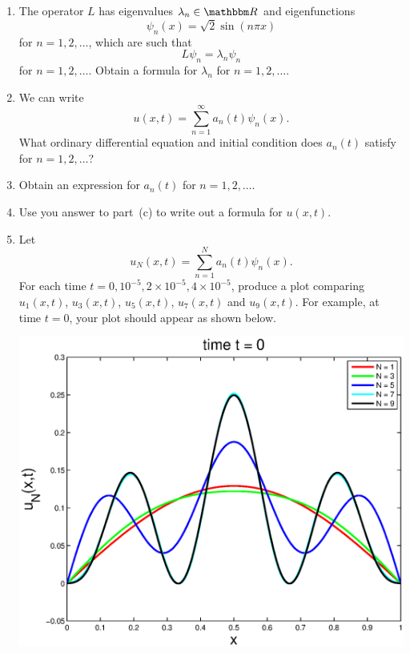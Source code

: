\begin{enumerate}
\item The operator $L$ has eigenvalues $\lambda_n\in\R$ and eigenfunctions
\[
\psi_n(x) = \sqrt{2} \sin(n \pi x)
\]
for $n = 1,2,\ldots$, which are such that
\[
L\psi_n=\lambda_n\psi_n
\]
for $n = 1,2,\ldots$. Obtain a formula for $\lambda_n$ for $n = 1,2,\ldots$.
\\
\item We can write
\[
u(x,t)=\sum_{n=1}^\infty a_n(t)\psi_n(x).
\]
What ordinary differential equation and initial condition does $a_n(t)$ satisfy for $n = 1,2,\ldots$?
\\
\item Obtain an expression for $a_n(t)$ for $n=1,2,\ldots$.
\\
\item Use you answer to part~(c) to write out a formula for $u(x,t)$.
\\
\item Let
\[
u_N(x,t)=\sum_{n=1}^N a_n(t)\psi_n(x).
\]
For each time $t=0,10^{-5},2\times 10^{-5},4 \times 10^{-5}$, produce a plot comparing
$u_1(x,t)$, $u_3(x,t)$, $u_5(x,t)$, $u_7(x,t)$ and $u_9(x,t)$. For example, at time $t=0$, your plot should appear as shown below.

\begin{center}
\includegraphics[scale=0.5]{fourth_a}
\end{center}

\end{enumerate}




